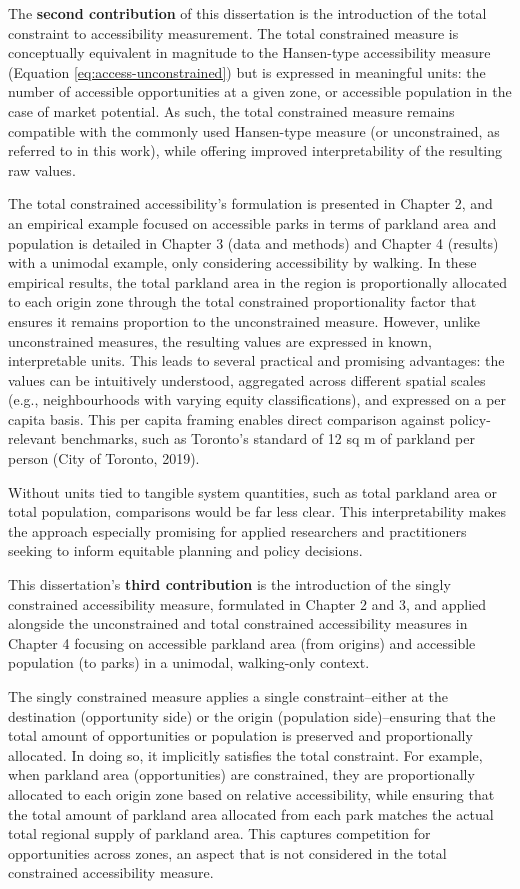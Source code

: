 \documentclass[
11pt, %
oneside, %
english, %
singlespacing, %
]{macthesis} %
\begin{document}
The \textbf{second contribution} of this dissertation is the introduction of the total constraint to accessibility measurement. The total constrained measure is conceptually equivalent in magnitude to the Hansen-type accessibility measure (Equation \ref{eq:access-unconstrained}) but is expressed in meaningful units: the number of accessible opportunities at a given zone, or accessible population in the case of market potential. As such, the total constrained measure remains compatible with the commonly used Hansen-type measure (or unconstrained, as referred to in this work), while offering improved interpretability of the resulting raw values.

The total constrained accessibility's formulation is presented in Chapter 2, and an empirical example focused on accessible parks in terms of parkland area and population is detailed in Chapter 3 (data and methods) and Chapter 4 (results) with a unimodal example, only considering accessibility by walking. In these empirical results, the total parkland area in the region is proportionally allocated to each origin zone through the total constrained proportionality factor that ensures it remains proportion to the unconstrained measure. However, unlike unconstrained measures, the resulting values are expressed in known, interpretable units. This leads to several practical and promising advantages: the values can be intuitively understood, aggregated across different spatial scales (e.g., neighbourhoods with varying equity classifications), and expressed on a per capita basis. This per capita framing enables direct comparison against policy-relevant benchmarks, such as Toronto's standard of 12 sq m of parkland per person (City of Toronto, 2019).

Without units tied to tangible system quantities, such as total parkland area or total population, comparisons would be far less clear. This interpretability makes the approach especially promising for applied researchers and practitioners seeking to inform equitable planning and policy decisions.

This dissertation's \textbf{third contribution} is the introduction of the singly constrained accessibility measure, formulated in Chapter 2 and 3, and applied alongside the unconstrained and total constrained accessibility measures in Chapter 4 focusing on accessible parkland area (from origins) and accessible population (to parks) in a unimodal, walking-only context.

The singly constrained measure applies a single constraint--either at the destination (opportunity side) or the origin (population side)--ensuring that the total amount of opportunities or population is preserved and proportionally allocated. In doing so, it implicitly satisfies the total constraint. For example, when parkland area (opportunities) are constrained, they are proportionally allocated to each origin zone based on relative accessibility, while ensuring that the total amount of parkland area allocated from each park matches the actual total regional supply of parkland area. This captures competition for opportunities across zones, an aspect that is not considered in the total constrained accessibility measure.
\end{document}
